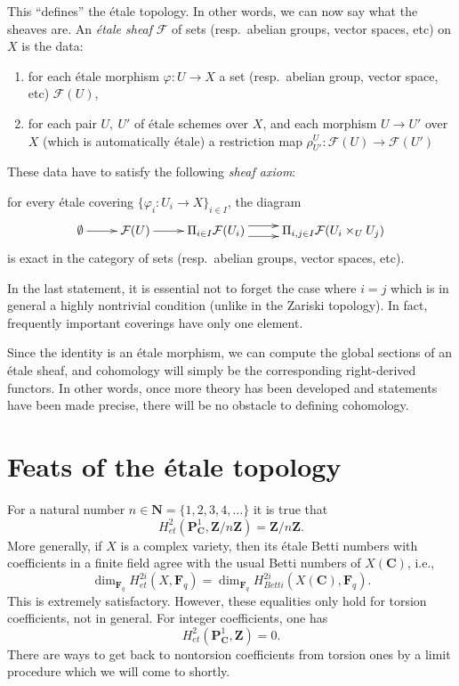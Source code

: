 \noindent
This ``defines'' the \'etale topology. In other words, we can now say what the
sheaves are. An {\it \'etale sheaf} $\mathcal{F}$ of sets
(resp.\ abelian groups, vector spaces, etc) on $X$ is the data:
\begin{enumerate}
\item for each \'etale morphism $\varphi : U \to X$ a set
(resp.\ abelian group, vector space, etc) $\mathcal{F}(U)$,
\item for each pair $U, \ U'$ of \'etale schemes over $X$,
and each morphism $U \to U'$ over $X$ (which is
automatically \'etale) a restriction map $\rho^{U}_{U'}
: \mathcal{F}(U) \to \mathcal{F}(U')$
\end{enumerate}
These data have to satisfy the following {\it sheaf axiom}:
\begin{list}{(*)}{}
\item for every \'etale covering $\{ \varphi_i : U_i \to X\}_{i \in
I}$, the diagram
$$
\xymatrix{
\emptyset \ar[r] &
\mathcal{F} (U) \ar[r] &
\Pi_{i \in I} \mathcal{F} (U_i) \ar@<1ex>[r] \ar@<-1ex>[r] &
\Pi_{i,j \in I} \mathcal{F} (U_i \times_U U_j)
}
$$
is exact in the category of sets (resp.\ abelian groups, vector spaces, etc).
\end{list}

\begin{remark}
\label{remark-i-is-j}
In the last statement, it is essential not to forget the case where $i = j$
which is in general a highly nontrivial condition (unlike in the Zariski
topology). In fact, frequently important coverings have only one element.
\end{remark}

\noindent
Since the identity is an \'etale morphism, we can compute the global sections
of an \'etale sheaf, and cohomology will simply be the corresponding
right-derived functors. In other words, once more theory has been developed and
statements have been made precise, there will be no obstacle to defining
cohomology.




\section{Feats of the \'etale topology}
\label{section-feats}

\noindent
For a natural number $n \in \mathbf{N} = \{1, 2, 3, 4, \dots\}$ it is true that
$$
H_{et}^2 (\mathbf{P}^1_\mathbf{C}, \mathbf{Z}/n\mathbf{Z}) =
\mathbf{Z}/n\mathbf{Z}.
$$
More generally, if $X$ is a complex variety, then its \'etale Betti numbers
with coefficients in a finite field agree with the usual Betti numbers of
$X(\mathbf{C})$, i.e.,
$$
\dim_{\mathbf{F}_q} H_{et}^{2i} (X, \mathbf{F}_q) = \dim_{\mathbf{F}_q}
H_{Betti}^{2i} (X(\mathbf{C}), \mathbf{F}_q).
$$
This is extremely satisfactory. However, these equalities only hold for torsion
coefficients, not in general. For integer coefficients, one has
$$
H_{et}^2 (\mathbf{P}^1_\mathbf{C}, \mathbf{Z}) = 0.
$$
There are ways to get back to nontorsion coefficients from torsion ones by a
limit procedure which we will come to shortly.




